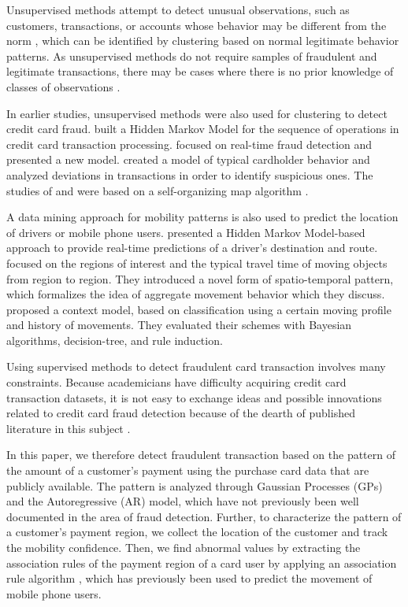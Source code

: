 \documentclass[final,authoryear,5p,times,twocolumn]{elsarticle}
\begin{document}
Unsupervised methods attempt to detect unusual observations, such as customers, transactions, or accounts whose behavior may be different from the norm \citep{ref3}, which can be identified by clustering based on normal legitimate behavior patterns. As unsupervised methods do not require samples of fraudulent and legitimate transactions, there may be cases where there is no prior knowledge of classes of observations \citep{ref3}.

In earlier studies, unsupervised methods were also used for clustering to detect credit card fraud. \citet{ref7} built a Hidden Markov Model for the sequence of operations in credit card transaction processing. \citet{ref8} focused on real-time fraud detection and presented a new model. \citet{ref9} created a model of typical cardholder behavior and analyzed deviations in transactions in order to identify suspicious ones. The studies of \citet{ref8} and \citet{ref9} were based on a self-organizing map algorithm \citep{ref5}.

A data mining approach for mobility patterns is also used to predict the location of drivers or mobile phone users. \citet{ref12} presented a Hidden Markov Model-based approach to provide real-time predictions of a driver's destination and route. \citet{ref13} focused on the regions of interest and the typical travel time of moving objects from region to region. They introduced a novel form of spatio-temporal pattern, which formalizes the idea of aggregate movement behavior which they discuss. \citet{ref15} proposed a context model, based on classification using a certain moving profile and history of movements. They evaluated their schemes with Bayesian algorithms, decision-tree, and rule induction.

Using supervised methods to detect fraudulent card transaction involves many constraints. Because academicians have difficulty acquiring credit card transaction datasets, it is not easy to exchange ideas and possible innovations related to credit card fraud detection because of the dearth of published literature in this subject \citep{ref10, ref11, ref3}.

In this paper, we therefore detect fraudulent transaction based on the pattern of the amount of a customer's payment using the purchase card data that are publicly available. The pattern is analyzed through Gaussian Processes (GPs) and the Autoregressive (AR) model, which have not previously been well documented in the area of fraud detection. Further, to characterize the pattern of a customer's payment region, we collect the location of the customer and track the mobility confidence. Then, we find abnormal values by extracting the association rules of the payment region of a card user by applying an association rule algorithm \citep{ref16}, which has previously been used to predict the movement of mobile phone users.
\end{document}
